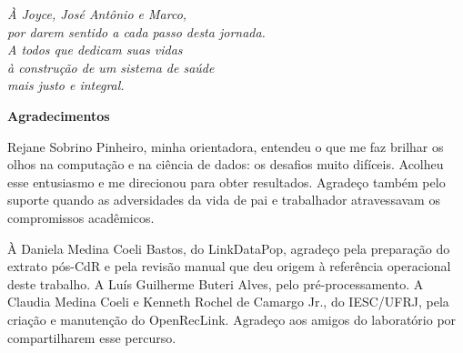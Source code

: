 \documentclass[12pt,a4paper,openany]{book}
\begin{document}




\newpage

\thispagestyle{empty}

\vspace*{\fill}

\begin{flushright}
\textit{À Joyce, José Antônio e Marco,\\
por darem sentido a cada passo desta jornada.\\[6pt]
A todos que dedicam suas vidas\\
à construção de um sistema de saúde\\
mais justo e integral.}
\end{flushright}





\newpage

\noindent

\vspace*{20pt}

\begin{center}

{\LARGE\bf Agradecimentos}

\end{center}

\vspace*{40pt}

Rejane Sobrino Pinheiro, minha orientadora, entendeu o que me faz brilhar os
olhos na computação e na ciência de dados: os desafios muito difíceis.
Acolheu esse entusiasmo e me direcionou para obter resultados. Agradeço
também pelo suporte quando as adversidades da vida de pai e trabalhador
atravessavam os compromissos acadêmicos.

À Daniela Medina Coeli Bastos, do LinkDataPop, agradeço pela preparação do
extrato pós-CdR e pela revisão manual que deu origem à referência operacional deste
trabalho. A Luís Guilherme Buteri Alves, pelo pré-processamento.
A Claudia Medina Coeli e Kenneth Rochel de Camargo Jr., do
IESC/UFRJ, pela criação e manutenção do OpenRecLink. Agradeço aos amigos
do laboratório por compartilharem esse percurso.
\end{document}
